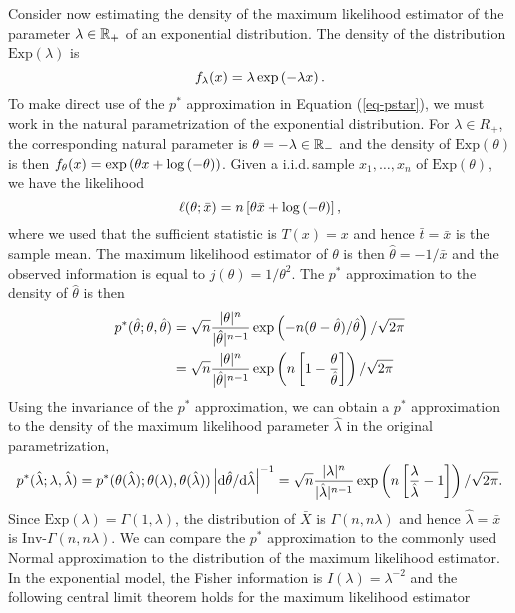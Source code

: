 \begin{example}
    Consider now estimating the density of the maximum likelihood estimator of the parameter $\lambda \in \mathbb{R}_+$ of an exponential distribution. The density of the distribution $\text{Exp}(\lambda)$ is
    \begin{equation*}
        f_\lambda(x) = \lambda \exp\left(-\lambda x\right).
    \end{equation*}
    To make direct use of the $p^*$ approximation in Equation (\ref{eq-pstar}), we must work in the natural parametrization of the exponential distribution. For $\lambda \in R_+$, the corresponding natural parameter is $\theta = -\lambda \in \mathbb{R}_-$ and the density of $\text{Exp}(\theta)$ is then $f_\theta(x) = \exp\left( \theta x + \log\left(-\theta\right)\right)$. Given a i.i.d.\,sample $x_1, \ldots, x_n$ of $\text{Exp}(\theta)$, we have the likelihood
    \begin{equation*}
        \ell(\theta; \bar x) = n\left[\theta \bar x + \log\left(-\theta\right)\right],
    \end{equation*}
    where we used that the sufficient statistic is $T(x) = x$ and hence $\bar t = \bar x$ is the sample mean. The maximum likelihood estimator of $\theta$ is then $\hat\theta = -1/\bar x$ and the observed information is equal to $j(\theta) = 1/\theta^2$. The $p^*$ approximation to the density of $\hat\theta$ is then
    \begin{align*}
        p^*(\hat\theta; \theta, \hat\theta) 
        &= \sqrt{n} \frac{|\theta|^n}{|\hat\theta|^{n-1}}\exp\left(-n(\theta - \hat\theta)/\hat\theta\right) / \sqrt{2\pi}\\
        &= \sqrt{n} \frac{|\theta|^n}{|\hat\theta|^{n-1}}\exp\left(n\left[1 - \frac{\theta}{\hat\theta}\right]\right) / \sqrt{2\pi}
    \end{align*}
    Using the invariance of the $p^*$ approximation, we can obtain a $p^*$ approximation to the density of the maximum likelihood parameter $\hat\lambda$ in the original parametrization,
    \begin{equation*}
        p^*(\hat\lambda; \lambda, \hat\lambda) = p^*(\theta(\hat\lambda); \theta(\lambda), \theta(\hat\lambda)) \left|\text{d} \hat\theta / \text{d} \hat\lambda\right|^{-1} = \sqrt{n} \frac{|\lambda|^n}{|\hat\lambda|^{n-1}}\exp\left(n\left[\frac{\lambda}{\hat\lambda} - 1\right]\right) / \sqrt{2\pi}.
    \end{equation*}
    Since $\text{Exp}(\lambda) = \Gamma(1, \lambda)$, the distribution of $\bar X$ is $\Gamma(n, n\lambda)$ and hence $\hat\lambda = \bar x$ is $\text{Inv-}\Gamma(n, n\lambda)$. We can compare the $p^*$ approximation to the commonly used Normal approximation to the distribution of the maximum likelihood estimator. In the exponential model, the Fisher information is $I(\lambda) = \lambda^{-2}$ and the following central limit theorem holds for the maximum likelihood estimator

\end{example}
